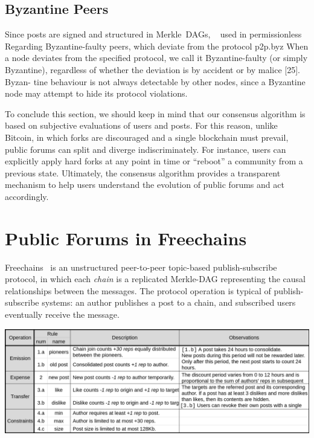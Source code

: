 \documentclass[12pt]{article}
\newcommand{\FC}       {Freechains\xspace}
\begin{document}
\subsection{Byzantine Peers}

Since posts are signed and structured in Merkle~DAGs, ~\cite{p2p.ipfs,p2p.bitcoin} used in permissionless
Regarding Byzantine-faulty peers, which deviate from the protocol
p2p.byz
When a node deviates from the specified protocol, we
call it Byzantine-faulty (or simply Byzantine), regardless of
whether the deviation is by accident or by malice [25]. Byzan-
tine behaviour is not always detectable by other nodes, since
a Byzantine node may attempt to hide its protocol violations.

To conclude this section, we should keep in mind that our consensus algorithm
is based on subjective evaluations of users and posts.
For this reason, unlike Bitcoin, in which forks are discouraged and a single
blockchain must prevail, public forums can split and diverge indiscriminately.
For instance, users can explicitly apply hard forks at any point in time or
``reboot'' a community from a previous state.
Ultimately, the consensus algorithm provides a transparent mechanism to help
users understand the evolution of public forums and act accordingly.

\section{Public Forums in Freechains}
\label{sec.freechains}

\FC~\cite{fcs.sbseg20} is an unstructured peer-to-peer topic-based
publish-subscribe protocol, in which each \emph{chain} is a replicated
Merkle-DAG representing the causal relationships between the messages.
%
The protocol operation is typical of publish-subscribe systems: an author
publishes a post to a chain, and subscribed users eventually receive the
message.

\begin{table}
\centering
\includegraphics[width=\textwidth]{rules.png}
\caption{
    Reputation rules for public forum chains in \FC.
    The chosen constants ($30~reps$, $24h$, etc) are arbitrary and target
    typical Internet forums.
}
\label{fig.rules}
\end{table}
\end{document}
